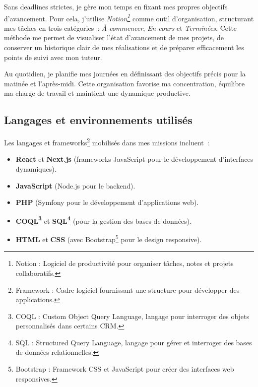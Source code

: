 Sans deadlines strictes, je gère mon temps en fixant mes propres objectifs d’avancement. Pour cela, j’utilise \textit{Notion\footnote{Notion : Logiciel de productivité pour organiser tâches, notes et projets collaboratifs.}} comme outil d’organisation, structurant mes tâches en trois catégories~: \textit{À commencer}, \textit{En cours} et \textit{Terminées}. Cette méthode me permet de visualiser l’état d’avancement de mes projets, de conserver un historique clair de mes réalisations et de préparer efficacement les points de suivi avec mon tuteur.

Au quotidien, je planifie mes journées en définissant des objectifs précis pour la matinée et l’après-midi. Cette organisation favorise ma concentration, équilibre ma charge de travail et maintient une dynamique productive.

\subsection{Langages et environnements utilisés}

Les langages et frameworks\footnote{Framework : Cadre logiciel fournissant une structure pour développer des applications.} mobilisés dans mes missions incluent~:\vspace{0.3cm}

\begin{itemize}
    \item \textbf{React} et \textbf{Next.js} (frameworks JavaScript pour le développement d’interfaces dynamiques).\vspace{0.3cm}
    \item \textbf{JavaScript} (Node.js pour le backend).\vspace{0.3cm}
    \item \textbf{PHP} (Symfony pour le développement d’applications web).\vspace{0.3cm}
    \item \textbf{COQL\footnote{COQL : Custom Object Query Language, langage pour interroger des objets personnalisés dans certains CRM.} }et \textbf{SQL\footnote{SQL : Structured Query Language, langage pour gérer et interroger des bases de données relationnelles.}
} (pour la gestion des bases de données).\vspace{0.3cm}
    \item \textbf{HTML} et \textbf{CSS} (avec Bootstrap\footnote{Bootstrap : Framework CSS et JavaScript pour créer des interfaces web responsives.} pour le design responsive).\vspace{0.3cm}
\end{itemize}


